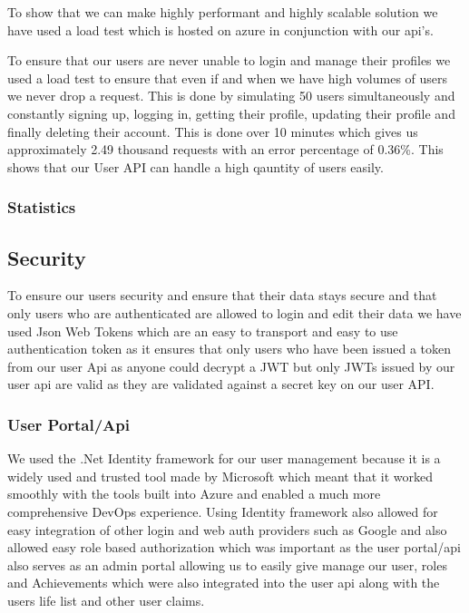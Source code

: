 \documentclass[a4paper]{article}
\begin{document}
To show that we can make highly performant and highly scalable solution we have 
used a load test which is hosted on azure in conjunction with our api's. \newline

To ensure that our users are never unable to login and manage their profiles we 
used a load test to ensure that even if and when we have high volumes of users we 
never drop a request. This is done by simulating 50 users simultaneously and 
constantly signing up, logging in, getting their profile, updating their profile
and finally deleting their account. This is done over 10 minutes which gives us
approximately 2.49 thousand requests with an error percentage of 0.36\%. This 
shows that our User API can handle a high qauntity of users easily.


\subsubsection{Statistics}

\subsection{Security}
To ensure our users security and ensure that their data stays secure and that 
only users who are authenticated are allowed to login and edit their data we 
have used Json Web Tokens which are an easy to transport and easy to use authentication
token as it ensures that only users who have been issued a token from our user Api
as anyone could decrypt a JWT but only JWTs issued by our user api are valid as they 
are validated against a secret key on our user API.

\subsubsection{User Portal/Api}

We used the .Net Identity framework for our user management because it is a widely 
used and trusted tool made by Microsoft which meant that it worked smoothly with 
the tools built into Azure and enabled a much more comprehensive DevOps experience.
\newline
Using Identity framework also allowed for easy integration of other login and web auth 
providers such as Google and also allowed easy role based authorization which was important 
as the user portal/api also serves as an admin portal allowing us to easily give manage 
our user, roles and Achievements which were also integrated into the user api along with 
the users life list and other user claims.
\end{document}
